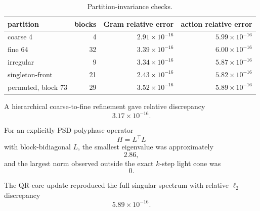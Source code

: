 \begin{table}[htbp]
\centering
\caption{Partition-invariance checks.}
\begin{tabular}{lrrr}
\toprule
partition & blocks & Gram relative error & action relative error\\
\midrule
coarse 4 & 4 & \(2.91\times10^{-16}\) & \(5.99\times10^{-16}\)\\
fine 64 & 32 & \(3.39\times10^{-16}\) & \(6.00\times10^{-16}\)\\
irregular & 9 & \(3.34\times10^{-16}\) & \(5.87\times10^{-16}\)\\
singleton-front & 21 & \(2.43\times10^{-16}\) & \(5.82\times10^{-16}\)\\
permuted, block 73 & 29 & \(3.52\times10^{-16}\) & \(5.89\times10^{-16}\)\\
\bottomrule
\end{tabular}
\end{table}

A hierarchical coarse-to-fine refinement gave relative discrepancy
\[
3.17\times10^{-16}.
\]

For an explicitly PSD polyphase operator
\[
H=L^\top L
\]
with block-bidiagonal \(L\), the smallest eigenvalue was approximately
\[
2.86,
\]
and the largest norm observed outside the exact \(k\)-step light cone was
\[
\boxed{0}.
\]

The QR-core update reproduced the full singular spectrum with relative
\(\ell_2\) discrepancy
\[
5.89\times10^{-16}.
\]



